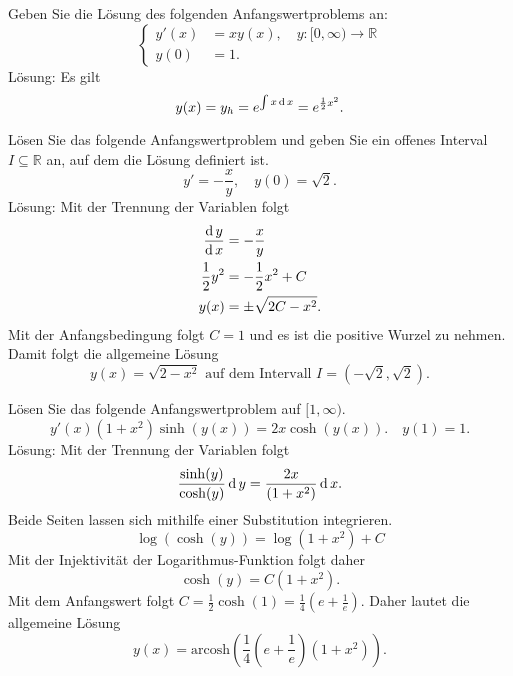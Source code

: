 Geben Sie die Lösung des folgenden Anfangswertproblems an:
\begin{displaymath}
  \begin{cases}
    y'(x) &= xy(x), \quad y : [0,\infty) \to \mathbb{R}\\
    y(0) &= 1.
  \end{cases}
\end{displaymath}
Lösung:
Es gilt
\begin{displaymath}
  y(x) = y_h = e^{\int x \operatorname{\mathop{}\!\mathrm{d}} x} = e^{\frac{1}{2} x^2}.  
\end{displaymath}

Lösen Sie das folgende Anfangswertproblem und geben Sie ein offenes Interval $I \subseteq \mathbb{R}$ an, auf dem die Lösung definiert ist.
\begin{displaymath}
  y' = -\frac{x}{y}, \quad y(0) = \sqrt{2}.
\end{displaymath}
Lösung:
Mit der Trennung der Variablen folgt
\begin{align*}
  \frac{\operatorname{\mathop{}\!\mathrm{d}} y}{\operatorname{\mathop{}\!\mathrm{d}} x} &= -\frac{x}{y}\\
  \frac{1}{2}y^2 &= -\frac{1}{2} x^2 + C\\
  y(x) &= \pm \sqrt{2C - x^2}.
\end{align*}
Mit der Anfangsbedingung folgt $C = 1$ und es ist die positive Wurzel zu nehmen.
Damit folgt die allgemeine Lösung
\begin{displaymath}
  y(x) = \sqrt{2 - x^2} \text{ auf dem Intervall } I = (-\sqrt{2}, \sqrt{2}).
\end{displaymath}

Lösen Sie das folgende Anfangswertproblem auf $[1, \infty)$.
\begin{displaymath}
  y'(x)(1 + x^2) \sinh(y(x)) = 2x \cosh(y(x)). \quad y(1) = 1.
\end{displaymath}
Lösung: Mit der Trennung der Variablen folgt
\begin{displaymath}
  \frac{\sinh(y)}{\cosh(y)} \operatorname{\mathop{}\!\mathrm{d}} y = \frac{2x}{(1 + x^2)} \operatorname{\mathop{}\!\mathrm{d}} x.
\end{displaymath}
Beide Seiten lassen sich mithilfe einer Substitution integrieren.
\begin{displaymath}
  \log(\cosh(y)) = \log(1 + x^2) + C
\end{displaymath}
Mit der Injektivität der Logarithmus-Funktion folgt daher
\begin{displaymath}
  \cosh(y) = C(1 + x^2).
\end{displaymath}
Mit dem Anfangswert folgt $C = \frac{1}{2} \cosh(1) = \frac{1}{4}\left(e + \frac{1}{e}\right)$.
Daher lautet die allgemeine Lösung
\begin{displaymath}
  y(x) = \text{arcosh}\left(\frac{1}{4}(e + \frac{1}{e})(1 + x^2)\right).
\end{displaymath}

